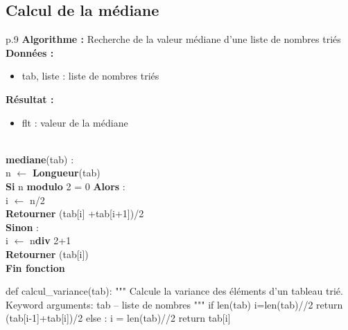 \documentclass[10pt]{article}
\begin{document}
\subsection{Calcul de la médiane} %


\begin{minipage}[c]{.48\linewidth}
\begin{pseudo}
\begin{center}
\begin{tabular}{p{.9\textwidth}}
\hline
\textbf{Algorithme :} Recherche de la valeur médiane d'une liste de nombres triés \\
\hline
\textbf{Données :}
\begin{itemize}
\item \textsf{tab}, liste : liste de nombres triés
\end{itemize}
\textbf{Résultat :} 
\begin{itemize}
\item flt : valeur de la médiane
\end{itemize}
\\
\textbf{mediane}(\textsf{tab}) :\\
\hspace{.4cm}\textsf{n} $\leftarrow$ \textbf{Longueur}\textsf{(tab)} \\
\hspace{.4cm}\textbf{Si} \textsf{n} \textbf{modulo} \textsf{2 = 0} \textbf{Alors} : \\
\hspace{.8cm} \textsf{i $\leftarrow$ n/2} \\
\hspace{.8cm} \textbf{Retourner} \textsf{(tab[i] +tab[i+1])/2} \\
\hspace{.4cm}\textbf{Sinon} :\\
\hspace{.8cm} \textsf{i $\leftarrow$ n}\textbf{div} \textsf{2+1} \\
\hspace{.8cm} \textbf{Retourner} \textsf{(tab[i])} \\
\textbf{Fin fonction} \\
\hline
\end{tabular}
\end{center}
\end{pseudo}
\end{minipage} \hfill
\begin{minipage}[c]{.48\linewidth}
\begin{py}
\begin{python}
def calcul_variance(tab):
    """ 
    Calcule la variance des éléments d'un tableau trié.
    Keyword arguments:
    tab -- liste de nombres
    """
    if len(tab)%
        i=len(tab)//2
        return (tab[i-1]+tab[i])/2
    else :
        i = len(tab)//2
    return tab[i]
\end{python}
\end{py}
\end{minipage}
\end{document}
